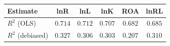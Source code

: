 \begin{tabular}{l*{5}{c}}
\hline\hline
 Estimate & lnR & lnL & lnK & ROA & lnRL \\
\hline
\addlinespace $ R^2$ (OLS) & $0.714$ & $0.712$ & $0.707$ & $0.682$ & $0.685$ \\
$ R^2$ (debiased) & $0.327$ & $0.306$ & $0.303$ & $0.207$ & $0.310$ \\
\hline\hline
\end{tabular}
